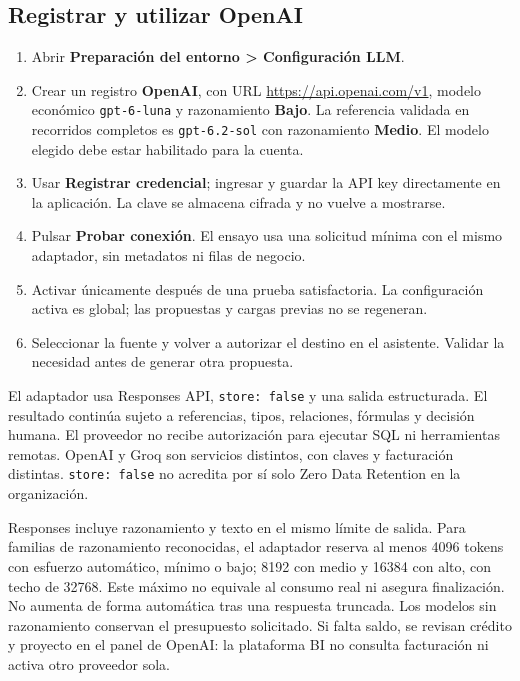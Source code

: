 \documentclass[11pt,letterpaper]{article}
\newcommand{\file}[1]{\texttt{#1}}
\begin{document}
\subsection{Registrar y utilizar OpenAI}

\begin{enumerate}
\item Abrir \textbf{Preparación del entorno > Configuración LLM}.
\item Crear un registro \textbf{OpenAI}, con URL \url{https://api.openai.com/v1},
modelo económico \file{gpt-6-luna} y razonamiento \textbf{Bajo}. La referencia validada
en recorridos completos es \file{gpt-6.2-sol} con razonamiento \textbf{Medio}.
El modelo elegido debe estar habilitado para la cuenta.
\item Usar \textbf{Registrar credencial}; ingresar y guardar la API key directamente
en la aplicación. La clave se almacena cifrada y no vuelve a mostrarse.
\item Pulsar \textbf{Probar conexión}. El ensayo usa una solicitud mínima con el
mismo adaptador, sin metadatos ni filas de negocio.
\item Activar únicamente después de una prueba satisfactoria. La configuración
activa es global; las propuestas y cargas previas no se regeneran.
\item Seleccionar la fuente y volver a autorizar el destino en el asistente.
Validar la necesidad antes de generar otra propuesta.
\end{enumerate}

El adaptador usa Responses API, \file{store: false} y una salida estructurada.
El resultado continúa sujeto a referencias, tipos, relaciones, fórmulas y decisión
humana. El proveedor no recibe autorización para ejecutar SQL ni herramientas
remotas. OpenAI y Groq son servicios distintos, con claves y facturación distintas.
\file{store: false} no acredita por sí solo Zero Data Retention en la organización.

Responses incluye razonamiento y texto en el mismo límite de salida. Para familias
de razonamiento reconocidas, el adaptador reserva al menos 4096 tokens con esfuerzo
automático, mínimo o bajo; 8192 con medio y 16384 con alto, con techo de 32768.
Este máximo no equivale al consumo real ni asegura finalización. No aumenta de forma
automática tras una respuesta truncada. Los modelos sin razonamiento conservan el
presupuesto solicitado. Si falta saldo, se revisan crédito y proyecto en el panel
de OpenAI: la plataforma BI no consulta facturación ni activa otro proveedor sola.
\end{document}
